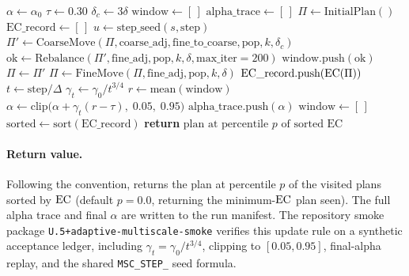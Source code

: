 \begin{algorithm}[t]
\caption{\ams{}($\text{fine\_adj}$, $\text{coarse\_adj}$,
  $\text{fine\_to\_coarse}$, $\text{pop}$, $k$, $\delta$,
  $\tau$, $\alpha_0$, $\Delta$, $\gamma_0$, $T$, $s$, $p$)}
\label{alg:ams}
\begin{algorithmic}[1]
\State $\alpha \gets \alpha_0$ 
\State $\tau \gets 0.30$ 
\State $\delta_c \gets 3\delta$ 
\State $\mathrm{window} \gets [\,]$ 
\State $\mathrm{alpha\_trace} \gets [\,]$
\State $\Pi \gets \text{InitialPlan}()$
\State $\mathrm{EC\_record} \gets [\,]$ 
  \State $u \gets \text{step\_seed}(s, \text{step})$
    \State $\Pi' \gets \text{CoarseMove}(\Pi, \text{coarse\_adj}, \text{fine\_to\_coarse},
           \text{pop}, k, \delta_c)$
    \State $\text{ok} \gets \text{Rebalance}(\Pi', \text{fine\_adj}, \text{pop}, k, \delta,
           \text{max\_iter}=200)$
    \State $\mathrm{window}.\text{push}(\text{ok})$
      \State $\Pi \gets \Pi'$
    \EndIf
  \Else
    \State $\Pi \gets \text{FineMove}(\Pi, \text{fine\_adj}, \text{pop}, k, \delta)$
  \EndIf
  \State $\mathrm{EC\_record}.\text{push}(\mathrm{EC}(\Pi))$
    \State $t \gets \text{step} / \Delta$
    \State $\gamma_t \gets \gamma_0 / t^{3/4}$
    \State $r \gets \text{mean}(\mathrm{window})$
    \State $\alpha \gets \text{clip}\!\bigl(\alpha + \gamma_t(r - \tau),\; 0.05,\; 0.95\bigr)$
    \State $\mathrm{alpha\_trace}.\text{push}(\alpha)$
    \State $\mathrm{window} \gets [\,]$
  \EndIf
\EndFor
\State $\text{sorted} \gets \text{sort}(\mathrm{EC\_record})$
\State \textbf{return} $\text{plan at percentile } p \text{ of sorted EC}$
\end{algorithmic}
\end{algorithm}

\paragraph{Return value.}
Following the \ms{} convention, \ams{} returns the plan at percentile $p$ of
the visited plans sorted by $\mathrm{EC}$ (default $p = 0.0$, returning the
minimum-$\mathrm{EC}$ plan seen).
The full alpha trace and final $\alpha$ are written to the run manifest.
The repository smoke package \texttt{U.5+adaptive-multiscale-smoke} verifies
this update rule on a synthetic acceptance ledger, including $\gamma_t =
\gamma_0/t^{3/4}$, clipping to $[0.05,0.95]$, final-alpha replay, and the
shared \texttt{MSC\_STEP\_} seed formula.

